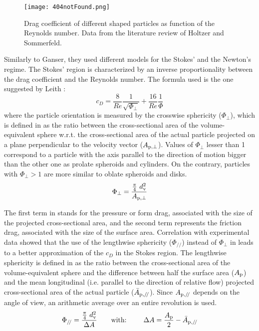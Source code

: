 		\begin{figure}
			\centering
			\texttt{[image: 404notFound.png]}
			\caption{Drag coefficient of different shaped particles as function of the Reynolds number. Data from the literature review of Holtzer and Sommerfeld. \cite{HoltzerSommerfeld-2008}}
			\label{fig: LitReviewHS}
		\end{figure}

		Similarly to Ganser, they used different models for the Stokes' and the Newton's regime. The Stokes' region is characterized by an inverse proportionality between the drag coefficient and the Reynolds number. The formula used is the one suggested by Leith \cite{Leith-1987}:
		\begin{equation}
			c_D = \frac{8}{Re} \frac{1}{\sqrt{\Phi_{\perp}}} + \frac{16}{Re} \frac{1}{\Phi}
			\label{eq: Leith}
		\end{equation}
		where the particle orientation is measured by the crosswise sphericity ($ \Phi_{\perp} $), which is defined in  as the ratio between the cross-sectional area of the volume-equivalent sphere w.r.t. the cross-sectional area of the actual particle projected on a plane perpendicular to the velocity vector ($ A_{\textup{p}, \perp} $).
		Values of $ \Phi_{\perp} $ lesser than 1 correspond to a particle with the axis parallel to the direction of motion bigger than the other one as prolate spheroids and cylinders. On the contrary, particles with $ \Phi_{\perp} > 1 $ are more similar to oblate spheroids and disks.
		\begin{equation}
			\Phi_{\perp} = \dfrac{\frac{\pi}{4}\ d_{\textup{v}}^2} {A_{\textup{p}, \perp}}
			\label{eq: Crosswise}
		\end{equation}
		
		The first term in  stands for the pressure or form drag, associated with the size of the projected cross-sectional area, and the second term represents the friction drag, associated with the size of the surface area. Correlation with experimental data showed that the use of the lengthwise sphericity ($ \Phi_{/\!/} $) instead of $ \Phi_{\perp} $ in  leads to a better approximation of the $ c_D $ in the Stokes region. The lengthwise sphericity is defined in  as the ratio between the cross-sectional area of the volume-equivalent sphere and the difference between half the surface area ($ A_{\textup{p}} $) and the mean longitudinal (i.e. parallel to the direction of relative flow) projected cross-sectional area of the actual particle ($ \bar{A}_{\textup{p},/\!/} $). Since $ A_{\textup{p},/\!/} $ depends on the angle of view, an arithmetic average over an entire revolution is used.
		\begin{equation}
			\Phi_{/\!/} = \dfrac{\frac{\pi}{4}\ d_{\textup{v}}^2} {\Delta A} \qquad \text{with: } \qquad \Delta A = \dfrac{A_{\textup{p}}}{2} - \bar{A}_{\textup{p},/\!/}
			\label{eq: Lengthwise}
		\end{equation}

